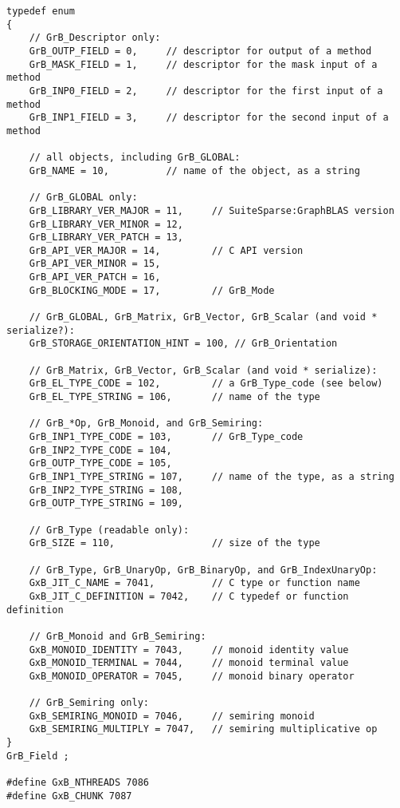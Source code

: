 {\footnotesize
\begin{verbatim}
typedef enum
{
    // GrB_Descriptor only:
    GrB_OUTP_FIELD = 0,     // descriptor for output of a method
    GrB_MASK_FIELD = 1,     // descriptor for the mask input of a method
    GrB_INP0_FIELD = 2,     // descriptor for the first input of a method
    GrB_INP1_FIELD = 3,     // descriptor for the second input of a method

    // all objects, including GrB_GLOBAL:
    GrB_NAME = 10,          // name of the object, as a string

    // GrB_GLOBAL only:
    GrB_LIBRARY_VER_MAJOR = 11,     // SuiteSparse:GraphBLAS version
    GrB_LIBRARY_VER_MINOR = 12,
    GrB_LIBRARY_VER_PATCH = 13,
    GrB_API_VER_MAJOR = 14,         // C API version
    GrB_API_VER_MINOR = 15,
    GrB_API_VER_PATCH = 16,
    GrB_BLOCKING_MODE = 17,         // GrB_Mode

    // GrB_GLOBAL, GrB_Matrix, GrB_Vector, GrB_Scalar (and void * serialize?):
    GrB_STORAGE_ORIENTATION_HINT = 100, // GrB_Orientation

    // GrB_Matrix, GrB_Vector, GrB_Scalar (and void * serialize):
    GrB_EL_TYPE_CODE = 102,         // a GrB_Type_code (see below)
    GrB_EL_TYPE_STRING = 106,       // name of the type

    // GrB_*Op, GrB_Monoid, and GrB_Semiring:
    GrB_INP1_TYPE_CODE = 103,       // GrB_Type_code
    GrB_INP2_TYPE_CODE = 104,
    GrB_OUTP_TYPE_CODE = 105,
    GrB_INP1_TYPE_STRING = 107,     // name of the type, as a string
    GrB_INP2_TYPE_STRING = 108,
    GrB_OUTP_TYPE_STRING = 109,

    // GrB_Type (readable only):
    GrB_SIZE = 110,                 // size of the type

    // GrB_Type, GrB_UnaryOp, GrB_BinaryOp, and GrB_IndexUnaryOp:
    GxB_JIT_C_NAME = 7041,          // C type or function name
    GxB_JIT_C_DEFINITION = 7042,    // C typedef or function definition

    // GrB_Monoid and GrB_Semiring:
    GxB_MONOID_IDENTITY = 7043,     // monoid identity value
    GxB_MONOID_TERMINAL = 7044,     // monoid terminal value
    GxB_MONOID_OPERATOR = 7045,     // monoid binary operator

    // GrB_Semiring only:
    GxB_SEMIRING_MONOID = 7046,     // semiring monoid
    GxB_SEMIRING_MULTIPLY = 7047,   // semiring multiplicative op
}
GrB_Field ;

#define GxB_NTHREADS 7086
#define GxB_CHUNK 7087


\end{verbatim}}
